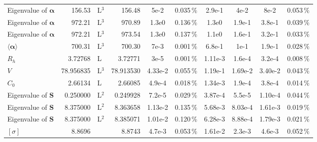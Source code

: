 \documentclass[12pt,letterpaper]{article}
\begin{document}
\begin{landscape}
\begin{center}
\begin{tabular}{ l d{3.8} l | d{3.8} c c c c c c }
Eigenvalue of $\mathbf{\alpha}$ & 156.53 & L$^{3}$ & 156.48& 5e-2& 0.035\,\%& 2.9e-1& 4e-2& 8e-2& 0.053\,\%\\ 
Eigenvalue of $\mathbf{\alpha}$ & 972.21 & L$^{3}$ & 970.89& 1.3e0& 0.136\,\%& 1.3e0& 1.9e-1& 3.8e-1& 0.039\,\%\\ 
Eigenvalue of $\mathbf{\alpha}$ & 972.21 & L$^{3}$ & 973.54& 1.3e0& 0.137\,\%& 1.1e0& 1.6e-1& 3.2e-1& 0.033\,\%\\ 
$\langle\mathbf{\alpha}\rangle$ & 700.31 & L$^{3}$ & 700.30& 7e-3& 0.001\,\%& 6.8e-1& 1e-1& 1.9e-1& 0.028\,\%\\ 
$R_{h}$ & 3.72768 & L & 3.72771& 3e-5& 0.001\,\%& 1.11e-3& 1.6e-4& 3.2e-4& 0.008\,\%\\ 
$V$ & 78.956835 & L$^{3}$ & 78.913530& 4.33e-2& 0.055\,\%& 1.19e-1& 1.69e-2& 3.40e-2& 0.043\,\%\\ 
$C_{0}$ & 2.66134 & L & 2.66085& 4.9e-4& 0.018\,\%& 1.34e-3& 1.9e-4& 3.8e-4& 0.014\,\%\\ 
Eigenvalue of $\mathbf{S}$ & 0.250000 & L$^{2}$ & 0.249928& 7.2e-5& 0.029\,\%& 3.87e-4& 5.5e-5& 1.10e-4& 0.044\,\%\\ 
Eigenvalue of $\mathbf{S}$ & 8.375000 & L$^{2}$ & 8.363658& 1.13e-2& 0.135\,\%& 5.68e-3& 8.03e-4& 1.61e-3& 0.019\,\%\\ 
Eigenvalue of $\mathbf{S}$ & 8.375000 & L$^{2}$ & 8.385071& 1.01e-2& 0.120\,\%& 6.28e-3& 8.88e-4& 1.79e-3& 0.021\,\%\\ 
$[\sigma]$ & 8.8696 &  & 8.8743& 4.7e-3& 0.053\,\%& 1.61e-2& 2.3e-3& 4.6e-3& 0.052\,\%\\
\end{tabular}
\end{center}

\pagebreak


\end{landscape}
\end{document}
